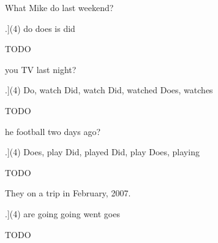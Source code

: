 \documentclass[a4paper]{article}
\begin{document}
\begin{question}
What  \blank[width=1cm]{} Mike do last weekend?

   \begin{tasks}[counter-format=tsk[A].](4)
              \task do
              \task does
              \task is
              \task did
   \end{tasks}

\end{question}
\begin{solution}
TODO
\end{solution}

\begin{question}
 \blank*[width=1cm]{} you \blank[width=1cm]{} TV last night?

   \begin{tasks}[counter-format=tsk[A].](4)
              \task Do, watch
              \task Did, watch
              \task Did, watched
              \task Does, watches
   \end{tasks}

\end{question}
\begin{solution}
TODO
\end{solution}

\begin{question}
 \blank*[width=1cm]{} he \blank[width=1cm]{} football two days ago?

   \begin{tasks}[counter-format=tsk[A].](4)
              \task Does, play
              \task Did, played
              \task Did, play
              \task Does, playing
   \end{tasks}

\end{question}
\begin{solution}
TODO
\end{solution}

\begin{question}
 They \blank[width=1cm]{} on a trip in February, 2007.

   \begin{tasks}[counter-format=tsk[A].](4)
              \task are going
              \task going
              \task went
              \task goes
   \end{tasks}

\end{question}
\begin{solution}
TODO
\end{solution}
\end{document}
